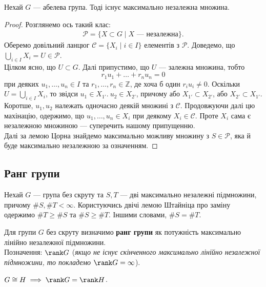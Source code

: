 \documentclass{math_library}
\begin{document}
\begin{theorem}
Нехай $G$ --- абелева група. Тоді існує максимально незалежна множина.
\end{theorem}

\begin{proof}
Розглянемо ось такий клас:
\begin{align*}
\mathcal{P} = \{X \subset G \mid X \text{ --- незалежна}\}.
\end{align*}
Оберемо довільний ланцюг $\mathcal{C} = \{X_i \mid i \in I\}$ елементів з $\mathcal{P}$. Доведемо, що $\displaystyle\bigcup_{i \in I} X_i = U \in \mathcal{P}$.\\
Цілком ясно, що $U \subset G$. Далі припустимо, що $U$ --- залежна множина, тобто
\[
r_1 u_1 + \dots + r_n u_n = 0
\]
при деяких $u_1,\dots,u_n \in I$ та $r_1,\dots,r_n \in \mathbb{Z}$, де хоча б один $r_i u_i \neq 0$. Оскільки $U = \displaystyle\bigcup_{i \in I} X_i$, то звідси $u_1 \in X_{1'}.\ u_2 \in X_{2'}$, причому або $X_{1'} \subset X_{2'}$, або $X_{2'} \subset X_{1'}$. Коротше, $u_1,u_2$ належать одночасно деякій множині з $\mathcal{C}$. Продовжуючи далі цю махінацію, одержимо, що $u_1,\dots,u_n \in X_i$ при деякому $X_i \in \mathcal{C}$. Проте $X_i$ сама є незалежною множиною --- суперечить нашому припущенню.\\
Далі за лемою Цорна знайдемо максимально можливу множину з $S \in \mathcal{P}$, яка й буде максимально незалежною за означенням.
\end{proof}

\subsection{Ранг групи}
\begin{remark}
Нехай $G$ --- група без скруту та $S,T$ --- дві максимально незалежні підмножини, причому $\# S, \# T < \infty$. Користуючись двічі лемою Штайніца про заміну одержимо $\# T \geq \# S$ та $\# S \geq \# T$. Іншими словами, $\# S = \# T$.
\end{remark}

\begin{definition}
Для групи $G$ без скруту визначимо \textbf{ранг групи} як потужність максимально лінійно незалежної підмножини.\\
Позначення: $\rank G$ (\textit{якщо не існує скінченного максимально лінійно незалежної підмножини, то покладемо $\rank G = \infty$}).
\end{definition}

\begin{remark}
$G \cong H \implies \rank G = \rank H$.
\end{remark}
\end{document}
